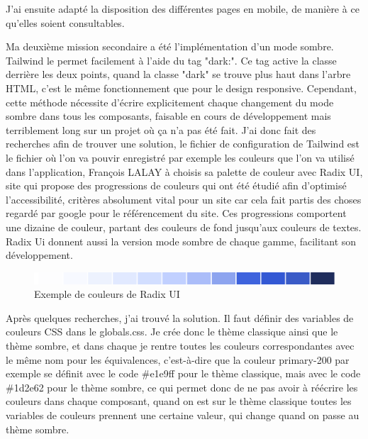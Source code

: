 \documentclass[a4paper,12pt]{report}
\begin{document}
J'ai ensuite adapté la disposition des différentes pages en mobile, de manière à ce qu'elles soient consultables. 

\vspace{1em}

Ma deuxième mission secondaire a été l'implémentation d'un mode sombre. Tailwind le permet facilement à l'aide du tag "dark:". Ce tag active la classe derrière les deux points, quand la classe "dark" se trouve plus haut dans l'arbre HTML, c'est le même fonctionnement que pour le design responsive. Cependant, cette méthode nécessite d'écrire explicitement chaque changement du mode sombre dans tous les composants, faisable en cours de développement mais terriblement long sur un projet où ça n'a pas été fait. J'ai donc fait des recherches afin de trouver une solution, le fichier de configuration de Tailwind est le fichier où l'on va pouvir enregistré par exemple les couleurs que l'on va utilisé dans l'application, François LALAY à choisis sa palette de couleur avec Radix UI, site qui propose des progressions de couleurs qui ont été étudié afin d'optimisé l'accessibilité, critères absolument vital pour un site car cela fait partis des choses regardé par google pour le référencement du site. Ces progressions comportent une dizaine de couleur, partant des couleurs de fond jusqu'aux couleurs de textes. Radix Ui donnent aussi la version mode sombre de chaque gamme, facilitant son développement.

\begin{figure}[H]
    \centering
    \includegraphics[scale=0.4]{colorRadixUi.png}
    \caption{Exemple de couleurs de Radix UI}
    \label{fig:radix-colors}
\end{figure}

Après quelques recherches, j'ai trouvé la solution. Il faut définir des variables de couleurs CSS dans le globals.css. Je crée donc le thème classique ainsi que le thème sombre, et dans chaque je rentre toutes les couleurs correspondantes avec le même nom pour les équivalences, c'est-à-dire que la couleur primary-200 par exemple se définit avec le code \#e1e9ff pour le thème classique, mais avec le code \#1d2e62 pour le thème sombre, ce qui permet donc de ne pas avoir à réécrire les couleurs dans chaque composant, quand on est sur le thème classique toutes les variables de couleurs prennent une certaine valeur, qui change quand on passe au thème sombre.
\end{document}
